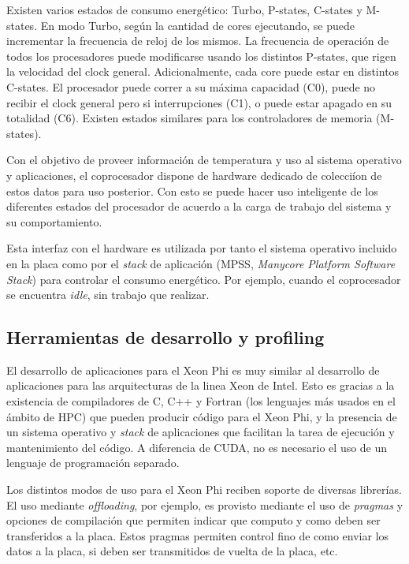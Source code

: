 Existen varios estados de consumo energ\'etico: Turbo, P-states, C-states y M-states. En modo Turbo, seg\'un la cantidad de
cores ejecutando, se puede incrementar la frecuencia de reloj de los mismos. La frecuencia de operaci\'on de todos los procesadores
puede modificarse usando los distintos P-states, que rigen la velocidad del clock general. Adicionalmente, cada core puede estar en
distintos C-states. El procesador puede correr a su m\'axima capacidad (C0), puede no recibir el clock general pero si interrupciones
(C1), o puede estar apagado en su totalidad (C6). Existen estados similares para los controladores de memoria (M-states).

Con el objetivo de proveer informaci\'on de temperatura y uso al sistema operativo y aplicaciones, el coprocesador dispone de
hardware dedicado de colecci\'ion de estos datos para uso posterior. Con esto se puede hacer uso inteligente de los diferentes
estados del procesador de acuerdo a la carga de trabajo del sistema y su comportamiento.

Esta interfaz con el hardware es utilizada por tanto el sistema operativo incluido en la placa como por el \textit{stack} de
aplicaci\'on (MPSS, \textit{Manycore Platform Software Stack}) para controlar el consumo energ\'etico. Por ejemplo, cuando el
coprocesador se encuentra \textit{idle}, sin trabajo que realizar.

\subsection{Herramientas de desarrollo y profiling}

El desarrollo de aplicaciones para el Xeon Phi es muy similar al desarrollo de aplicaciones para las arquitecturas
de la linea Xeon de Intel. Esto es gracias a la existencia de compiladores de C, C++ y Fortran (los lenguajes m\'as usados en
el \'ambito de HPC) que pueden producir c\'odigo para el Xeon Phi, y la presencia de un sistema operativo y \textit{stack}
de aplicaciones que facilitan la tarea de ejecuci\'on y mantenimiento del c\'odigo. A diferencia de \nvidia CUDA, no es necesario
el uso de un lenguaje de programaci\'on separado.

Los distintos modos de uso para el Xeon Phi reciben soporte de diversas librer\'ias. El uso mediante \textit{offloading}, por ejemplo,
es provisto mediante el uso de \textit{pragmas} y opciones de compilaci\'on que permiten indicar que computo y como deben ser transferidos
a la placa. Estos pragmas permiten control fino de como enviar los datos a la placa, si deben ser transmitidos de vuelta de la placa,
etc.

